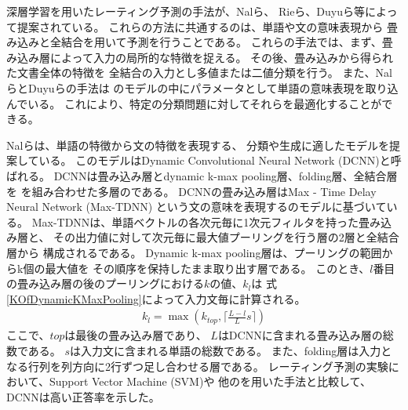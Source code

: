 深層学習を用いたレーティング予測の手法が、Nalら\cite{nal14}、
Rieら\cite{rie14}、Duyuら\cite{duyu15}等によって提案されている。
これらの方法に共通するのは、単語や文の意味表現から
畳み込み\nn と全結合\nn を用いて予測を行うことである。
これらの手法では、まず、畳み込み層によって入力の局所的な特徴を捉える。
その後、畳み込み\nn から得られた文書全体の特徴を
全結合\nn の入力とし多値または二値分類を行う。
また、Nalら\cite{nal14}とDuyuら\cite{duyu15}の手法は
\nn のモデルの中にパラメータとして単語の意味表現を取り込んでいる。
これにより、特定の分類問題に対してそれらを最適化することができる。

Nalら\cite{nal14}は、単語の特徴から文の特徴を表現する、
分類や生成に適したモデルを提案している。
このモデルはDynamic Convolutional Neural Network (DCNN)と呼ばれる。
DCNNは畳み込み層とdynamic k-max pooling層、folding層、全結合層を
を組み合わせた多層の\nn である。
DCNNの畳み込み層はMax - Time Delay Neural Network (Max-TDNN)\cite{ronan08}
という文の意味を表現する\nn のモデルに基づいている。
Max-TDNNは、単語ベクトルの各次元毎に1次元フィルタを持った畳み込み層と、
その出力値に対して次元毎に最大値プーリングを行う層の2層と全結合層から
構成される\nn である。
Dynamic k-max pooling層は、プーリングの範囲からk個の最大値を
その順序を保持したまま取り出す層である。
このとき、$l$番目の畳み込み層の後のプーリングにおける$k$の値、$k_l$は
式\ref{KOfDynamicKMaxPooling}によって入力文毎に計算される。
\begin{gather} \label{KOfDynamicKMaxPooling}
  k_l = \max ( k_{top}, \lceil \frac{L - l}{L}s \rceil )
\end{gather}
ここで、$top$は最後の畳み込み層であり、
$L$はDCNNに含まれる畳み込み層の総数である。
$s$は入力文に含まれる単語の総数である。
また、folding層は入力となる行列を列方向に2行ずつ足し合わせる層である。
レーティング予測の実験において、Support Vector Machine (SVM)や
他の\nn を用いた手法と比較して、DCNNは高い正答率を示した。

